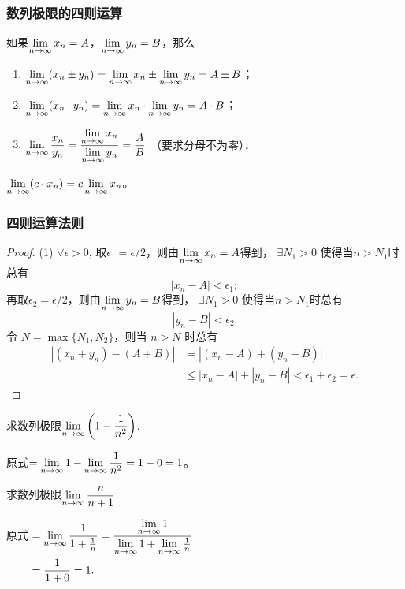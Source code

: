 \documentclass[14pt,notheorems,leqno,xcolor={rgb}]{beamer} %
\begin{document}
\begin{frame}
\frametitle{数列极限的四则运算}
\begin{theorem}
如果$\lim\limits_{n\to\infty}x_n=A$，$\lim\limits_{n\to\infty}y_n=B$，那么
\begin{enumerate}
  \item $\lim\limits_{n\to\infty}(x_n \pm y_n) = \lim\limits_{n\to\infty}x_n \pm \lim\limits_{n\to\infty}y_n = A \pm B$；
  \item $\lim\limits_{n\to\infty}(x_n \cdot y_n) = \lim\limits_{n\to\infty}x_n \cdot \lim\limits_{n\to\infty}y_n = A \cdot B$；
  \item $\lim\limits_{n\to\infty}\dfrac{x_n}{y_n} = \dfrac{\lim\limits_{n\to\infty}x_n}{\lim\limits_{n\to\infty}y_n} = \dfrac{A}{B}$ 
      （要求分母不为零）．
\end{enumerate}
\end{theorem}
\vpause
\begin{corollary*}
$\lim\limits_{n\to\infty}(c\cdot x_n) = c \lim\limits_{n\to\infty}x_n$。
\end{corollary*}
\end{frame}

\begin{jframe}
\frametitle{四则运算法则}
\small
\begin{proof}
(1) $\forall\epsilon>0$, 取$\epsilon_1=\epsilon/2$，则由$\lim\limits_{n\to\infty}x_n=A$得到，
$\exists N_1>0$ 使得当$n>N_1$时总有
\[ |x_n-A|<\epsilon_1; \]
再取$\epsilon_2=\epsilon/2$，则由$\lim\limits_{n\to\infty}y_n=B$得到，
$\exists N_1>0$ 使得当$n>N_1$时总有
\[|y_n-B|<\epsilon_2. \]
令 $N=\max\{N_1,N_2\}$，则当 $n>N$ 时总有
\begin{align*}
|(x_n+y_n)-(A+B)|&=|(x_n-A)+(y_n-B)|\\
 &\le|x_n-A|+|y_n-B| <\epsilon_1+\epsilon_2=\epsilon.
\end{align*}
\end{proof}
\end{jframe}

\begin{frame}
\begin{example}
求数列极限$\lim\limits_{n\to\infty}\bigg(1-\dfrac1{n^2}\bigg)$.
\end{example}
\pause
\begin{solution}
原式$=\lim\limits_{n\to\infty}1-\lim\limits_{n\to\infty}\dfrac1{n^2}=1-0=1$。
\end{solution}
\vpause
\begin{example}
 求数列极限$\lim\limits_{n\to\infty}\dfrac{n}{n+1}$.
\end{example}
\pause
\begin{solution}
原式\unskip$\begin{aligned}[t]
&=\lim\limits_{n\to\infty}\dfrac{1}{1+\frac1n}
         =\dfrac{\lim\limits_{n\to\infty}1}{\lim\limits_{n\to\infty}1+\lim\limits_{n\to\infty}\frac1n}\\
&=\dfrac{1}{1+0}=1.\end{aligned}$
\end{solution}
\end{frame}
\end{document}
